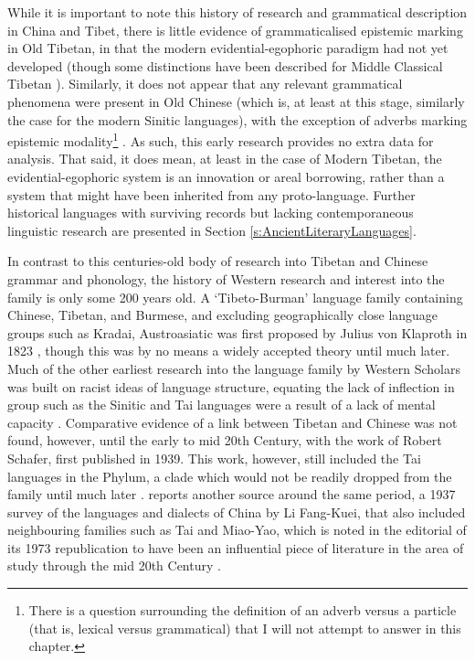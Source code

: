 While it is important to note this history of research and grammatical description in China and Tibet, there is little evidence of grammaticalised epistemic marking in Old Tibetan, in that the modern evidential-egophoric paradigm had not yet developed \cite{Hill2014} (though some distinctions have been described for Middle Classical Tibetan \cite{Oisel2024}). Similarly, it does not appear that any relevant grammatical phenomena were present in Old Chinese (which is, at least at this stage, similarly the case for the modern Sinitic languages), with the exception of adverbs marking epistemic modality\footnote{There is a question surrounding the definition of an adverb versus a particle (that is, lexical versus grammatical) that I will not attempt to answer in this chapter.} \cite{Pulleyblank1995}. As such, this early research provides no extra data for analysis. That said, it does mean, at least in the case of Modern Tibetan, the evidential-egophoric system is an innovation or areal borrowing, rather than a system that might have been inherited from any proto-language. Further historical languages with surviving records but lacking contemporaneous linguistic research are presented in Section \ref{s:AncientLiteraryLanguages}.

In contrast to this centuries-old body of research into Tibetan and Chinese grammar and phonology, the history of Western research and interest into the family is only some 200 years old. A `Tibeto-Burman' language family containing Chinese, Tibetan, and Burmese, and excluding geographically close language groups such as Kradai, Austroasiatic was first proposed by Julius von Klaproth in 1823 \cite{VanDriem2014}, though this was by no means a widely accepted theory until much later. Much of the other earliest research into the language family by Western Scholars was built on racist ideas of language structure, equating the lack of inflection in group such as the Sinitic and Tai languages were a result of a lack of mental capacity \cite{VanDriem2014}. Comparative evidence of a link between Tibetan and Chinese was not found, however, until the early to mid 20th Century, with the work of Robert Schafer, first published in 1939. This work, however, still included the Tai languages in the Phylum, a clade which would not be readily dropped from the family until much later \cite{Matisoff1991}.  reports another source around the same period, a 1937 survey of the languages and dialects of China by Li Fang-Kuei, that also included neighbouring families such as Tai and Miao-Yao, which is noted in the editorial of its 1973 republication to have been an influential piece of literature in the area of study through the mid 20th Century \cite{Li1973}.

